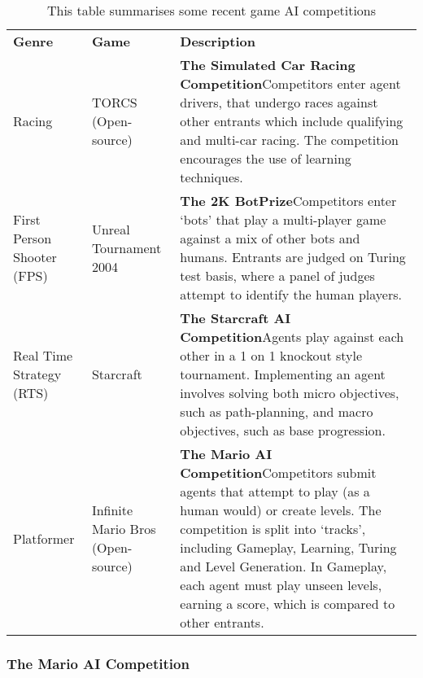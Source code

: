 \begin{table}
  \begin{adjustwidth}{-4cm}{-4cm}
  \begin{center} \small
    \begin{tabular}{ | >{\raggedright}p{2cm} | >{\raggedright}p{2cm} | p{7.5cm} |}
    \hline
    \textbf{Genre} & \textbf{Game} & \textbf{Description} \TBstrut \\ \thickhline
    Racing & TORCS (Open-source) \cite{torcs} &  
    \textbf{The Simulated Car Racing Competition}\newline Competitors enter agent drivers, that undergo races against other entrants which include qualifying and multi-car racing. The competition encourages the use of learning techniques. \cite{scrc}
      \\ \hline
    First Person Shooter (FPS) & Unreal Tournament 2004 &
    \textbf{The 2K BotPrize}\newline Competitors enter `bots' that play a multi-player game against a mix of other bots and humans. Entrants are judged on Turing test basis, where a panel of judges attempt to identify the human players. \cite{2kbot}
       \\ \hline
    Real Time Strategy (RTS) & Starcraft &
    \textbf{The Starcraft AI Competition}\newline Agents play against each other in a 1 on 1 knockout style tournament. Implementing an agent involves solving both micro objectives, such as path-planning, and macro objectives, such as base progression. \cite{starcomp}
       \\ \hline
    Platformer & Infinite Mario Bros (Open-source) &
    \textbf{The Mario AI Competition}\newline Competitors submit agents that attempt to play (as a human would) or create levels. The competition is split into `tracks', including Gameplay, Learning, Turing and Level Generation. In Gameplay, each agent must play unseen levels, earning a score, which is compared to other entrants. \cite{2012the} 
       \\ \hline
    
    \end{tabular}
  \end{center}
  \end{adjustwidth}
  \caption{\small This table summarises some recent game AI competitions \cite{2014how}}
  \label{tab:gameaicomp}
\end{table}

\subsubsection{The Mario AI Competition}
\label{subsec:marioaibench}

